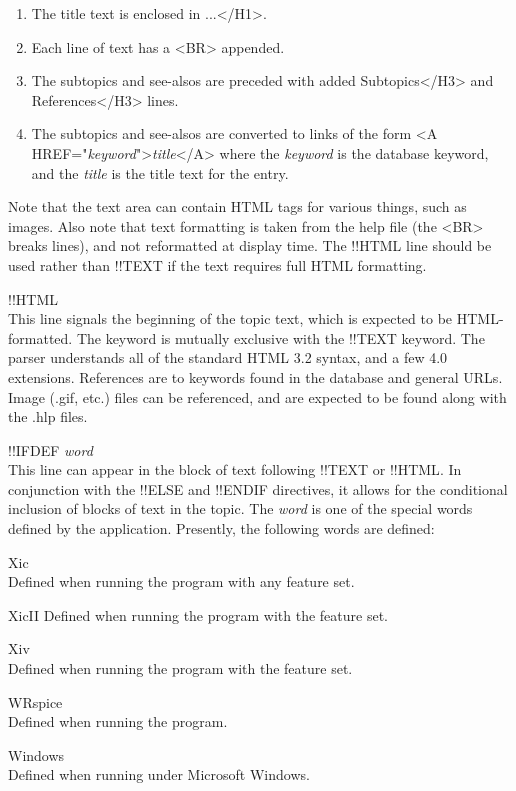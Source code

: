 \begin{description}
\begin{enumerate}\rr
\item The title text is enclosed in {...</H1>}.
\item Each line of text has a {\vt <BR>} appended.
\item The subtopics and see-alsos are preceded with added
    {Subtopics</H3>} and {References</H3>} lines.
\item The subtopics and see-alsos are converted to links of the form
    {\vt <A HREF="{\it keyword\/}">{\it title\/}</A>} where the {\it
    keyword} is the database keyword, and the {\it title} is the title
    text for the entry.
\end{enumerate}

Note that the text area can contain HTML tags for various things, such
as images.  Also note that text formatting is taken from the help file
(the {\vt <BR>} breaks lines), and not reformatted at display time. 
The {\vt !!HTML} line should be used rather than {\vt !!TEXT} if the
text requires full HTML formatting.

\item{\vt !!HTML}\\
This line signals the beginning of the topic text, which is expected
to be HTML-formatted.  The keyword is mutually exclusive with the {\vt
!!TEXT} keyword.  The parser understands all of the standard HTML 3.2
syntax, and a few 4.0 extensions.  References are to keywords found in
the database and general URLs.  Image ({\vt .gif}, etc.) files can be
referenced, and are expected to be found along with the {\vt .hlp}
files.

\item{\vt !!IFDEF {\it word}}\\
This line can appear in the block of text following {\vt !!TEXT} or
{\vt !!HTML}.  In conjunction with the {\vt !!ELSE} and {\vt !!ENDIF}
directives, it allows for the conditional inclusion of blocks of text
in the topic.  The {\it word} is one of the special words defined by
the application.  Presently, the following words are defined:

\begin{description}
\item{\vt Xic}\\
Defined when running the {\Xic} program with any feature set.
\item{\vt XicII}
Defined when running the {\Xic} program with the {\XicII} feature set.
\item{\vt Xiv}\\
Defined when running the {\Xic} program with the {\Xiv} feature set.
\item{\vt WRspice}\\
Defined when running the {\WRspice} program. 
\item{\vt Windows}\\
Defined when running under Microsoft Windows.
\end{description}


\end{description}

